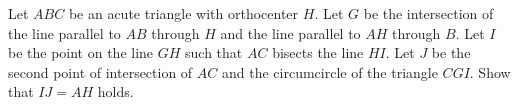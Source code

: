 Let $ABC$ be an acute triangle with orthocenter $H$. Let $G$ be the intersection of the line parallel to $AB$ through $H$ and the line parallel to $AH$ through $B$. Let $I$ be the point on the line $GH$ such that $AC$ bisects the line $HI$. Let $J$ be the second point of intersection of $AC$ and the circumcircle of the triangle $CGI$. Show that $IJ=AH$ holds.